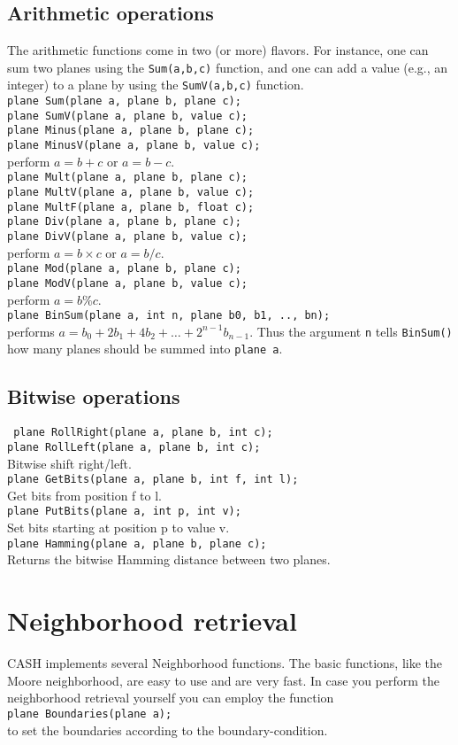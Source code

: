 \documentclass[12pt]{article}
\newcommand{\mtt}[1]{\texttt{\\#1\\}}
\begin{document}
\subsection{Arithmetic operations}
The arithmetic functions come in two (or more) flavors. 
For instance, one can sum two planes using the {\tt Sum(a,b,c)}
function, and one can add a value (e.g., an integer) to
a plane by using the {\tt SumV(a,b,c)} function.
\mtt{ 
plane Sum(plane a, plane b, plane c);\\
plane SumV(plane a, plane b, value c);\\
plane Minus(plane a, plane b, plane c);\\
plane MinusV(plane a, plane b, value c);
}
perform $a=b+c$ or $a = b - c$.
\mtt{ 
plane Mult(plane a, plane b, plane c);\\
plane MultV(plane a, plane b, value c);\\
plane MultF(plane a, plane b, float c);\\
plane Div(plane a, plane b, plane c);\\
plane DivV(plane a, plane b, value c);
}
perform $a = b \times c$ or $a = b / c$.
\mtt{ 
plane Mod(plane a, plane b, plane c);\\
plane ModV(plane a, plane b, value c);
}
perform $a = b \% c$.  
\mtt{ plane BinSum(plane a, int n, plane b0, b1, .., bn);}
performs $a = b_0 + 2 b_1 + 4 b_2 + \dots + 2^{n-1}b_{n-1}$.
Thus the argument {\tt n} tells {\tt BinSum()} how many
planes should be summed into {\tt plane a}.
 
\subsection{Bitwise operations}
\texttt{ 
plane RollRight(plane a, plane b, int c);\\
plane RollLeft(plane a, plane b, int c);\\
}
Bitwise shift right/left.
\mtt{ plane GetBits(plane a, plane b, int f, int l);}
Get bits from position f to l.
\mtt{ plane PutBits(plane a, int p, int v);}
Set bits starting at position p to value v.
\mtt{ plane Hamming(plane a, plane b, plane c);}
Returns the bitwise Hamming distance between two planes.

\section{Neighborhood retrieval}
CASH implements several Neighborhood functions.
The basic functions, like the Moore neighborhood,
are easy to use and are very fast.
In case you perform the neighborhood retrieval yourself
you can employ the function
\mtt{ plane Boundaries(plane a);}
to set the boundaries according to the boundary-condition.
\end{document}

